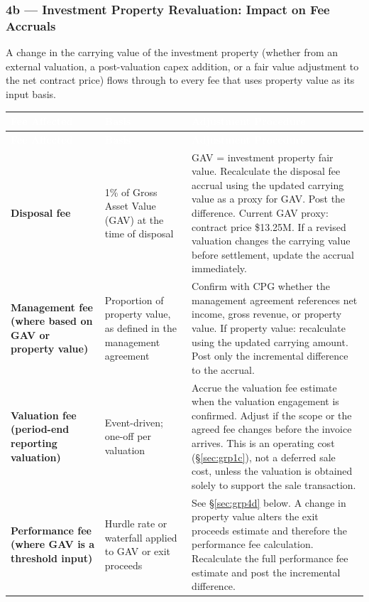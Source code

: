 \documentclass[10pt,a4paper]{article}
\begin{document}
\subsubsection{4b --- Investment Property Revaluation: Impact on Fee Accruals}
\label{sec:grp4b}

A change in the carrying value of the investment property (whether from an external valuation, a post-valuation capex addition, or a fair value adjustment to the net contract price) flows through to every fee that uses property value as its input basis.

{\small\sffamily
\begin{longtable}{@{} L{3.0cm} L{2.5cm} L{7.2cm} @{}}
\textcolor{white}{\bfseries Fee Affected} & \textcolor{white}{\bfseries Basis} & \textcolor{white}{\bfseries Adjustment Procedure} \\
\midrule
\endfirsthead
{}\textcolor{white}{\bfseries Fee Affected} & \textcolor{white}{\bfseries Basis} & \textcolor{white}{\bfseries Adjustment Procedure} \\
\midrule
\endhead
\textbf{Disposal fee} & 1\% of Gross Asset Value (GAV) at the time of disposal & GAV = investment property fair value. Recalculate the disposal fee accrual using the updated carrying value as a proxy for GAV. Post the difference. Current GAV proxy: contract price \$13.25M. If a revised valuation changes the carrying value before settlement, update the accrual immediately. \\
\textbf{Management fee (where based on GAV or property value)} & Proportion of property value, as defined in the management agreement & Confirm with CPG whether the management agreement references net income, gross revenue, or property value. If property value: recalculate using the updated carrying amount. Post only the incremental difference to the accrual. \\
\textbf{Valuation fee (period-end reporting valuation)} & Event-driven; one-off per valuation & Accrue the valuation fee estimate when the valuation engagement is confirmed. Adjust if the scope or the agreed fee changes before the invoice arrives. This is an operating cost (\S\ref{sec:grp1c}), not a deferred sale cost, unless the valuation is obtained solely to support the sale transaction. \\
\textbf{Performance fee (where GAV is a threshold input)} & Hurdle rate or waterfall applied to GAV or exit proceeds & See \S\ref{sec:grp4d} below. A change in property value alters the exit proceeds estimate and therefore the performance fee calculation. Recalculate the full performance fee estimate and post the incremental difference. \\
\bottomrule
\end{longtable}}
\end{document}
